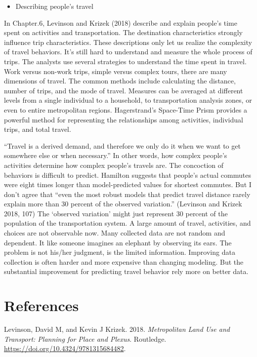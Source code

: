 \documentclass[12pt,]{article}
\providecommand{\tightlist}{%
  \setlength{\itemsep}{0pt}\setlength{\parskip}{0pt}}
\begin{document}
\begin{itemize}
\tightlist
\item
  Describing people's travel
\end{itemize}

In Chapter.6, Levinson and Krizek (2018) describe and explain people's
time spent on activities and transportation. The destination
characteristics strongly influence trip characteristics. These
descriptions only let us realize the complexity of travel behaviors.
It's still hard to understand and measure the whole process of trips.
The analysts use several strategies to understand the time spent in
travel. Work versus non-work trips, simple versus complex tours, there
are many dimensions of travel. The common methods include calculating
the distance, number of trips, and the mode of travel. Measures can be
averaged at different levels from a single individual to a household, to
transportation analysis zones, or even to entire metropolitan regions.
Hagerstrand's Space-Time Prism provides a powerful method for
representing the relationships among activities, individual trips, and
total travel.

``Travel is a derived demand, and therefore we only do it when we want
to get somewhere else or when necessary.'' In other words, how complex
people's activities determine how complex people's travels are. The
concoction of behaviors is difficult to predict. Hamilton suggests that
people's actual commutes were eight times longer than model-predicted
values for shortest commutes. But I don't agree that ``even the most
robust models that predict travel distance rarely explain more than 30
percent of the observed variation.'' (Levinson and Krizek 2018, 107) The
`observed variation' might just represent 30 percent of the population
of the transportation system. A large amount of travel, activities, and
choices are not observable now. Many collected data are not random and
dependent. It like someone imagines an elephant by observing its ears.
The problem is not his/her judgment, is the limited information.
Improving data collection is often harder and more expensive than
changing modeling. But the substantial improvement for predicting travel
behavior rely more on better data.

\hypertarget{references}{%
\section*{References}\label{references}}

\hypertarget{refs}{}
\leavevmode\hypertarget{ref-levinson2018metropolitan}{}%
Levinson, David M, and Kevin J Krizek. 2018. \emph{Metropolitan Land Use
and Transport: Planning for Place and Plexus}. Routledge.
\url{https://doi.org/10.4324/9781315684482}.
\end{document}

